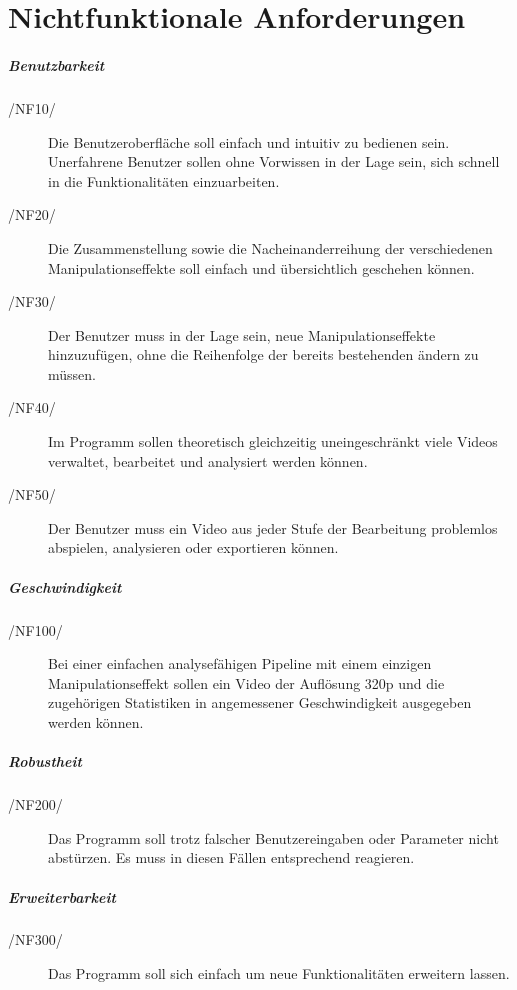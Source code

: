 \section{Nichtfunktionale Anforderungen}

\subparagraph{Benutzbarkeit}
\begin{description}
	\item[/NF10/] Die Benutzeroberfläche soll einfach und intuitiv zu bedienen sein. Unerfahrene Benutzer sollen ohne Vorwissen in der Lage sein, sich schnell in die Funktionalitäten einzuarbeiten.
	\item[/NF20/] Die Zusammenstellung sowie die Nacheinanderreihung der verschiedenen Manipulationseffekte soll einfach und übersichtlich geschehen können. 
	\item[/NF30/] Der Benutzer muss in der Lage sein, neue Manipulationseffekte hinzuzufügen, ohne die Reihenfolge der bereits bestehenden ändern zu müssen.
	\item[/NF40/] Im Programm sollen theoretisch gleichzeitig uneingeschränkt viele Videos verwaltet, bearbeitet und analysiert werden können.
	\item[/NF50/] Der Benutzer muss ein Video aus jeder Stufe der Bearbeitung problemlos abspielen, analysieren oder exportieren können.
\end{description}

\subparagraph{Geschwindigkeit}

\begin{description}
	\item[/NF100/] Bei einer einfachen analysefähigen Pipeline mit einem einzigen Manipulationseffekt sollen ein Video der Auflösung 320p und die zugehörigen Statistiken in angemessener Geschwindigkeit
 ausgegeben werden können.
\end{description}

\subparagraph{Robustheit}

\begin{description}
	\item[/NF200/] Das Programm soll trotz falscher Benutzereingaben oder Parameter nicht abstürzen. Es muss in diesen Fällen entsprechend reagieren.
\end{description}

\subparagraph{Erweiterbarkeit}

\begin{description}
	\item[/NF300/] Das Programm soll sich einfach um neue Funktionalitäten erweitern lassen.
\end{description}
